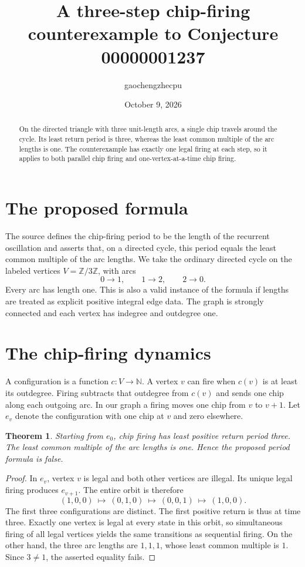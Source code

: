 \documentclass[11pt]{article}
\title{A three-step chip-firing counterexample to Conjecture 00000001237}
\author{gaochengzhecpu}
\date{October 9, 2026}
\newtheorem{theorem}{Theorem}
\begin{document}
\maketitle
\begin{abstract}
On the directed triangle with three unit-length arcs, a single chip
travels around the cycle. Its least return period is three, whereas the
least common multiple of the arc lengths is one. The counterexample
has exactly one legal firing at each step, so it applies to both
parallel chip firing and one-vertex-at-a-time chip firing.
\end{abstract}

\section{The proposed formula}
The source defines the chip-firing period to be the length of the
recurrent oscillation and asserts that, on a directed cycle, this period
equals the least common multiple of the arc lengths.
We take the ordinary directed cycle on the labeled vertices
$V=\mathbb Z/3\mathbb Z$, with arcs
\[
 0\longrightarrow1,\qquad1\longrightarrow2,\qquad2\longrightarrow0.
\]
Every arc has length one. This is also a valid instance of the formula
if lengths are treated as explicit positive integral edge data.
The graph is strongly connected and each vertex has indegree and
outdegree one.

\section{The chip-firing dynamics}
A configuration is a function $c:V\to\mathbb N$.
A vertex $v$ can fire when $c(v)$ is at least its outdegree. Firing
subtracts that outdegree from $c(v)$ and sends one chip along each
outgoing arc. In our graph a firing moves one chip from $v$ to $v+1$.
Let $e_v$ denote the configuration with one chip at $v$ and zero elsewhere.

\begin{theorem}
Starting from $e_0$, chip firing has least positive return period three.
The least common multiple of the arc lengths is one. Hence the proposed
period formula is false.
\end{theorem}
\begin{proof}
In $e_v$, vertex $v$ is legal and both other vertices are illegal.
Its unique legal firing produces $e_{v+1}$. The entire orbit is therefore
\[
 (1,0,0)\ \longmapsto\ (0,1,0)\ \longmapsto\ (0,0,1)
 \ \longmapsto\ (1,0,0).
\]
The first three configurations are distinct. The first positive return
is thus at time three. Exactly one vertex is legal at every state in
this orbit, so simultaneous firing of all legal vertices yields the
same transitions as sequential firing.
On the other hand, the three arc lengths are $1,1,1$, whose least common
multiple is $1$. Since $3\neq1$, the asserted equality fails.
\end{proof}
\end{document}
